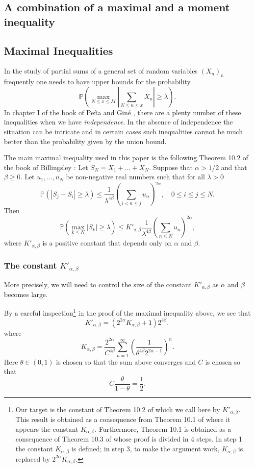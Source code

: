 \documentclass[reqno0,12pt]{amsart}
\theoremstyle{remark}
\newcommand{\PP}{\mathbb{P}}
\begin{document}
\subsection{A combination of a maximal and a moment inequality}
\subsection{Maximal Inequalities} In the study of partial sums of a general set of random variables $(X_n)_n$ frequently one needs to have upper bounds for the probability
$$\PP\left(\max_{N\leq x\leq M}\left|\sum_{N\leq n\leq x}X_n\right|\geq \lambda\right).$$
In chapter I of the book of Pe\~na and Gin\'e \cite{pena_decoupling}, there are a plenty number of these inequalities when we have \textit{independence}. In the absence of independence the situation can be intricate and in certain cases such inequalities cannot be much better than the probability given by the union bound.

The main maximal inequality used in this paper is the following Theorem 10.2 of the book of Billingsley \cite{billingsley_convergence_prob_meas}: Let $S_N=X_1+...+X_N$. Suppose that $\alpha>1/2$ and that $\beta\geq 0$. Let $u_1,...,u_N$ be non-negative real numbers such that for all $\lambda>0$
\begin{equation*}
\PP(|S_j-S_i|\geq \lambda)\leq\frac{1}{\lambda^{4\beta}}\left(\sum_{i<n\leq j}u_n\right)^{2\alpha},\quad 0\leq i\leq j \leq N.
\end{equation*}
Then
\begin{equation*}
\PP\left(\max_{k\leq N}|S_k|\geq \lambda \right)\leq K'_{a,\beta}\frac{1}{\lambda^{4\beta}}\left(\sum_{n\leq N}u_n\right)^{2\alpha},
\end{equation*}
where $K'_{\alpha, \beta}$ is a positive constant that depends only on $\alpha$ and $\beta$. 

\subsubsection{The constant $K'_{\alpha,\beta}$}\label{subsection constant} More precisely, we will need to control the size of the constant $K'_{\alpha, \beta}$ as $\alpha$ and $\beta$ becomes large. 

By a careful inspection\footnote{Our target is the constant of Theorem 10.2 of \cite{billingsley_convergence_prob_meas} which we call here by $K'_{\alpha, \beta}$. This result is obtained as a consequence from Theorem 10.1 of \cite{billingsley_convergence_prob_meas} where it appears the constant $K_{\alpha,\beta}$. Furthermore, Theorem 10.1 is obtained as a consequence of Theorem 10.3 of \cite{billingsley_convergence_prob_meas} whose proof is divided in 4 steps. In step 1 the constant $K_{\alpha,\beta}$ is defined; in step 3, to make the argument work, $K_{\alpha,\beta}$ is replaced by $2^{2\alpha}K_{\alpha,\beta}$.} in the proof of the maximal inequality above, we see that 
$$K'_{\alpha, \beta}=(2^{2\alpha}K_{\alpha,\beta}+1)2^{4\beta},$$
where
$$K_{\alpha, \beta}= \frac{2^{2\alpha}}{C^{4\beta}}\sum_{n=1}^\infty\left(\frac{1}{\theta^{4\beta}2^{2\alpha-1}}\right)^n.$$
Here $\theta\in(0,1)$ is chosen so that the sum above converges and $C$ is chosen so that
$$C\frac{\theta}{1-\theta}=\frac{1}{2}.$$
\end{document}
